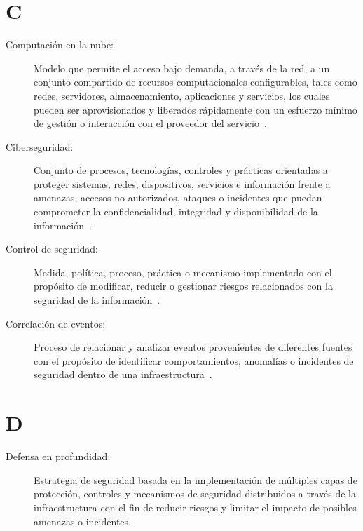 \section*{C}
\begin{description}
	\item[Computación en la nube:] Modelo que permite el acceso bajo demanda, a través de la red, a un conjunto compartido de recursos computacionales configurables, tales como redes, servidores, almacenamiento, aplicaciones y servicios, los cuales pueden ser aprovisionados y liberados rápidamente con un esfuerzo mínimo de gestión o interacción con el proveedor del servicio~\cite{mell2011nist}.
	
	\item[Ciberseguridad:] Conjunto de procesos, tecnologías, controles y prácticas orientadas a proteger sistemas, redes, dispositivos, servicios e información frente a amenazas, accesos no autorizados, ataques o incidentes que puedan comprometer la confidencialidad, integridad y disponibilidad de la información~\cite{NISTCybersecurity}.

	\item[Control de seguridad:] Medida, política, proceso, práctica o mecanismo implementado con el propósito de modificar, reducir o gestionar riesgos relacionados con la seguridad de la información~\cite{ISO27000Glossary}.
	
	\item[Correlación de eventos:]Proceso de relacionar y analizar eventos provenientes de diferentes fuentes con el propósito de identificar comportamientos, anomalías o incidentes de seguridad dentro de una infraestructura~\cite{IBM_SIEM}.
\end{description}

\section*{D}
\begin{description}
	\item[Defensa en profundidad:] Estrategia de seguridad basada en la implementación de múltiples capas de protección, controles y mecanismos de seguridad distribuidos a través de la infraestructura con el fin de reducir riesgos y limitar el impacto de posibles amenazas o incidentes.
\end{description}

